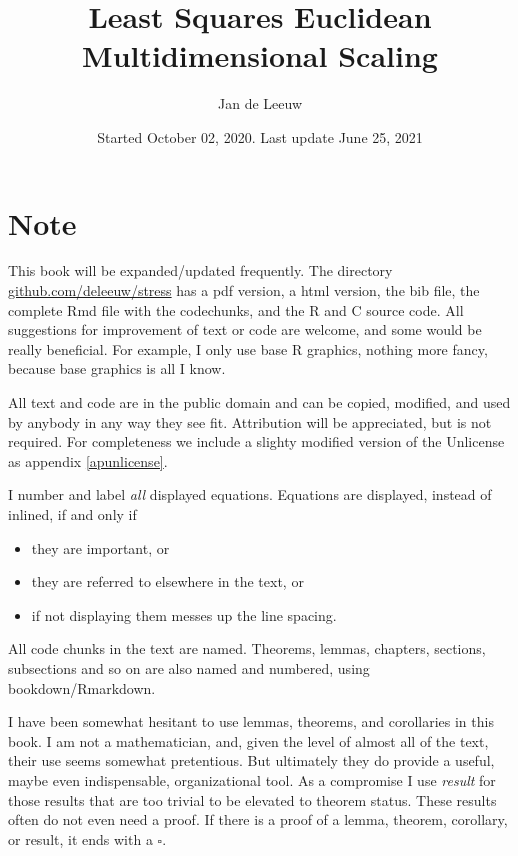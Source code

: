 \documentclass[
  12pt,
]{book}
\title{Least Squares Euclidean Multidimensional Scaling}
\author{Jan de Leeuw}
\date{Started October 02, 2020. Last update June 25, 2021}
\providecommand{\tightlist}{%
  \setlength{\itemsep}{0pt}\setlength{\parskip}{0pt}}
\theoremstyle{definition}
\theoremstyle{definition}
\theoremstyle{definition}
\theoremstyle{definition}
\theoremstyle{remark}
\begin{document}
\maketitle

{
\setcounter{tocdepth}{4}
\tableofcontents
}
\hypertarget{note}{%
\chapter*{Note}\label{note}}

This book will be expanded/updated frequently. The directory
\href{https://github.com/deleeuw/stress}{github.com/deleeuw/stress}
has a pdf version, a html version, the bib file, the complete Rmd
file with the codechunks, and the R and C source code. All suggestions for improvement
of text or code are welcome, and some would be really beneficial. For
example, I only use base R graphics, nothing more fancy, because base
graphics is all I know.

All text and code are in the public domain and can be copied, modified,
and used by anybody in any way they see fit. Attribution will be
appreciated, but is not required. For completeness we include a slighty
modified version of the Unlicense as appendix \ref{apunlicense}.

I number and label \emph{all} displayed equations. Equations are displayed,
instead of inlined, if and only if

\begin{itemize}
\tightlist
\item
  they are important, or
\item
  they are referred to elsewhere in the text, or
\item
  if not displaying them messes up the line spacing.
\end{itemize}

All code chunks in the text are named. Theorems, lemmas, chapters,
sections, subsections and so on are also named and numbered, using
bookdown/Rmarkdown.

I have been somewhat hesitant to use lemmas, theorems, and corollaries
in this book. I am not a mathematician, and, given the level of almost
all of the text, their use seems somewhat pretentious. But ultimately
they do provide a useful, maybe even indispensable, organizational tool.
As a compromise I use \emph{result} for those results that are too trivial to
be elevated to theorem status. These results often do not even need a
proof. If there is a proof of a lemma, theorem, corollary, or result, it
ends with a \(\square\).
\end{document}
